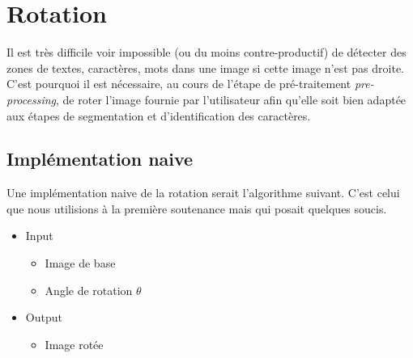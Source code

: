 \section{Rotation}

Il est très difficile voir impossible (ou du moins contre-productif) de
détecter des zones de textes, caractères, mots dans une image si cette image
n'est pas droite. C'est pourquoi il est nécessaire, au cours de l'étape de
pré-traitement \emph{pre-processing}, de roter l'image fournie par l'utilisateur
afin qu'elle soit bien adaptée aux étapes de segmentation et d'identification
des caractères. \\

\subsection{Implémentation naive}

Une implémentation naive de la rotation serait l'algorithme suivant. C'est
celui que nous utilisions à la première soutenance mais qui posait quelques
soucis. \\

\begin{itemize}
  \item{Input} \\
    \begin{itemize}
      \item Image de base
      \item Angle de rotation $\theta$
    \end{itemize}
  \item{Output}
    \begin{itemize}
      \item Image rotée
    \end{itemize}
\end{itemize}

